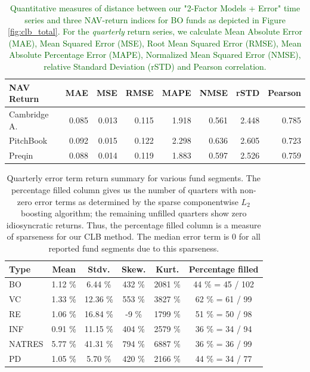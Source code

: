 \documentclass[12pt]{article}
\begin{document}

\begin{table}[ht]
	\centering
	\begin{tabular}{l rrrrrrr}
		{NAV Return} & {MAE} & {MSE} & {RMSE} & {MAPE} & {NMSE} & {rSTD} & {Pearson} \\ 
		\hline
		\hline
		Cambridge A. & 0.085 & 0.013 & 0.115 & 1.918 & 0.561 & 2.448 & 0.785 \\  
	 	PitchBook & 0.092 & 0.015 & 0.122 & 2.298 & 0.636 & 2.605 & 0.723 \\   
	 	Preqin & 0.088 & 0.014 & 0.119 & 1.883 & 0.597 & 2.526 & 0.759 \\ 
		\hline
		\hline
	\end{tabular}
	\caption{
		\textcolor{darkgreen}{
			Quantitative measures of distance between our "2-Factor Models + Error" time series and three NAV-return indices for BO funds as depicted in Figure \ref{fig:clb_total}.
			For the \emph{quarterly} return series, we calculate 
			Mean Absolute Error (MAE),
			Mean Squared Error (MSE),
			Root Mean Squared Error (RMSE),
			Mean Absolute Percentage Error (MAPE),
			Normalized Mean Squared Error (NMSE),
			relative Standard Deviation (rSTD)
			and Pearson correlation.
			}
		}
	\label{tab:accuracy_measures}
\end{table}


\begin{table}[ht]
	\centering
	\begin{tabular}{l | c c c c | c}
		Type & Mean  & Stdv. & Skew. & Kurt.  & Percentage filled \\
		\hline 
		\hline
		BO & 1.12 \% & 6.44 \% & 432 \% & 2081 \% & 44 \% = 45 / 102  \\ 
		VC & 1.33 \% & 12.36 \% &  553 \% & 3827 \% & 62 \% = 61 / 99 \\ 
		RE & 1.06 \% & 16.84 \% & -9 \% & 1799 \% & 51 \% = 50 / 98 \\ 
		INF & 0.91 \% & 11.15 \% & 404 \% & 2579 \% & 36 \% = 34 / 94  \\ 
		NATRES  & 5.77 \% & 41.31 \% & 794 \% & 6887 \% & 36 \% = 36 / 99 \\ 
		PD & 1.05 \% & 5.70 \% & 420 \% & 2166 \% & 44 \% = 34 / 77 \\ 
		\hline 
		\hline 
	\end{tabular} 
	\caption{
		Quarterly error term return summary for various fund segments.
		The percentage filled column gives us the number of quarters with non-zero error terms as determined by the sparse componentwise $L_2$ boosting algorithm; the remaining unfilled quarters show zero idiosyncratic returns.
		Thus, the percentage filled column is a measure of sparseness for our CLB method.
		The median error term is 0 for all reported fund segments due to this sparseness.
	}
\label{tab:error_summary}
\end{table}
\end{document}

